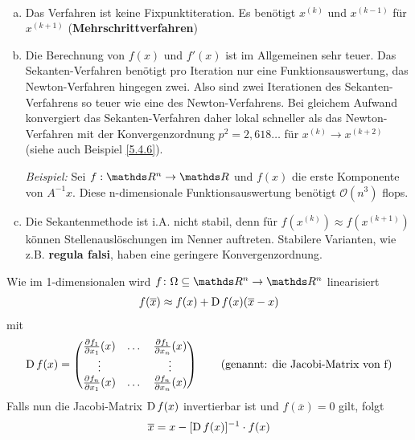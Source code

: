 \begin{Beme}~
  \begin{enumerate}[a)]
  \item Das Verfahren ist keine Fixpunktiteration.
    Es benötigt $x^{(k)}$ und $x^{(k-1)}$ für $x^{(k+1)}$
    (\textbf{Mehrschrittverfahren})
  \item Die Berechnung von $f(x)$ und $f'(x)$ ist im Allgemeinen
    sehr teuer. Das Sekanten-Verfahren benötigt pro Iteration
    nur eine Funktionsauswertung, das Newton-Verfahren hingegen zwei.
    Also sind zwei Iterationen des Sekanten-Verfahrens so teuer wie eine
    des Newton-Verfahrens. 
    Bei gleichem Aufwand konvergiert das Sekanten-Verfahren daher lokal
    schneller als das Newton-Verfahren mit der Konvergenzordnung 
    $p^2= 2,618\dotsc$ für $x^{(k)}\to x^{(k+2)}$ 
    (siehe auch Beispiel \ref{5.4.6}).
    
    \textit{Beispiel:} 
    Sei $f:\R^n\rightarrow\R$ und $f(x)$ die erste Komponente von $ A^{-1}x$.
    Diese n-dimensionale Funktionsauswertung benötigt $\mathcal{O}(n^3)$ flops.
  \item Die Sekantenmethode ist i.A. nicht stabil, 
    denn für $f(x^{(k)})\approx f(x^{(k+1)})$
    können Stellenauslöschungen im Nenner auftreten.
    Stabilere Varianten, wie z.B. \textbf{regula falsi}, 
    haben eine geringere Konvergenzordnung.
  \end{enumerate}
\end{Beme}



Wie im 1-dimensionalen wird $f\colon\Omega\subseteq\R^n\to\R^n$
linearisiert 
\begin{gather}
  f(\overline{x}) \approx f(x) +\operatorname{D} f(x)(\overline{x}-x)
  \label{V.5.1}
\end{gather}
mit
\begin{gather*}
  \operatorname{D} f(x) = \begin{pmatrix}
    \frac{\partial f_1}{\partial x_1}(x) 
    &\dots & \frac{\partial f_1}{\partial x_n}(x)\\
    \vdots && \vdots\\
    \frac{\partial f_n}{\partial x_1}(x) 
    &\dots & \frac{\partial f_n}{\partial x_n}(x)
  \end{pmatrix}
  \qquad \text{(genannt: die Jacobi-Matrix von f)}
\end{gather*}
Falls nun die Jacobi-Matrix $\operatorname{D} f(x)$ invertierbar
ist und $f(\overline{x})= 0$ gilt, folgt
\begin{gather*}
  \overline{x} = x-[\operatorname{D} f(x)]^{-1}\cdot f(x)
\end{gather*}

